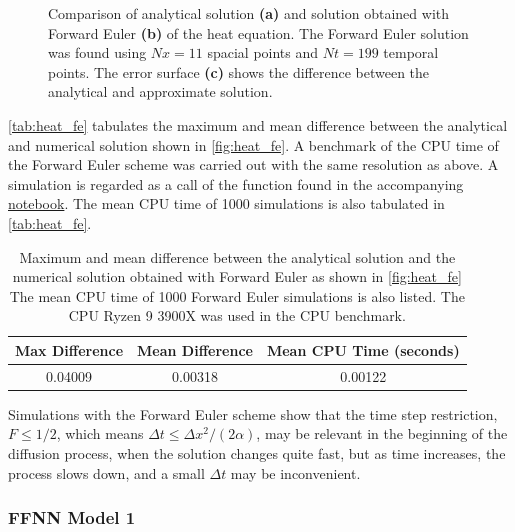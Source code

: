 \begin{figure}[H]
\caption{Comparison of analytical solution \textbf{(a)} and solution obtained with Forward Euler \textbf{(b)} of the heat equation. The Forward Euler solution was found using $Nx = 11$ spacial points and $Nt = 199$ temporal points. The error surface \textbf{(c)} shows the difference between the analytical and approximate solution.}
\label{fig:heat_fe}
\end{figure}


\autoref{tab:heat_fe} tabulates the maximum and mean difference between the analytical and numerical solution shown in \autoref{fig:heat_fe}. A benchmark of the CPU time of the Forward Euler scheme was carried out with the same resolution as above. A simulation is regarded as a call of the function  found in the accompanying \href{https://github.com/nicolossus/FYS-STK4155-Project3/blob/master/notebooks/heat_pde_with_fe_and_tf.ipynb}{notebook}. The mean CPU time of 1000 simulations is also tabulated in \autoref{tab:heat_fe}.

\begin{table}[H]
\caption{Maximum and mean difference between the analytical solution and the numerical solution obtained with Forward Euler as shown in \autoref{fig:heat_fe}  
The mean CPU time of 1000 Forward Euler simulations is also listed. The CPU Ryzen 9 3900X was used in the CPU benchmark.}
\centering
{}
\begin{tabular}{ccc}
\hline
\hline 
Max Difference & Mean Difference & Mean CPU Time (seconds)
\\
\hline 
\hline 
0.04009 & 0.00318 & 0.00122
\\
\hline
\hline
\end{tabular}
\label{tab:heat_fe}
\end{table}



Simulations with the Forward Euler scheme show that the time step restriction, $F \leq 1/2$, which means $\Delta t \leq \Delta x^2 / (2\alpha)$, may be relevant in the beginning of the diffusion process, when the solution changes quite fast, but as time increases, the process slows down, and a small $\Delta t$ may be inconvenient.

\subsubsection{FFNN Model 1}

